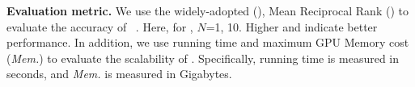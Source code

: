 \noindent
\textbf{Evaluation metric.}
We use the widely-adopted \HitNFull{} (\HitN{}), Mean Reciprocal Rank (\MRR{}) to evaluate the accuracy of \ClusterEA{}~\cite{MTransE17,IPTransE17, GCN-Align18, KECG19, RREA20, DualAMN21, EASY21}. Here, for \HitN{}, $N$=1, 10.
Higher \HitN{} and \MRR{} indicate better performance.
In addition, we use running time and maximum GPU Memory cost (\emph{Mem.}) to evaluate the scalability of \ClusterEA{}. Specifically, running time is measured in seconds, and \emph{Mem.} is measured in Gigabytes.

